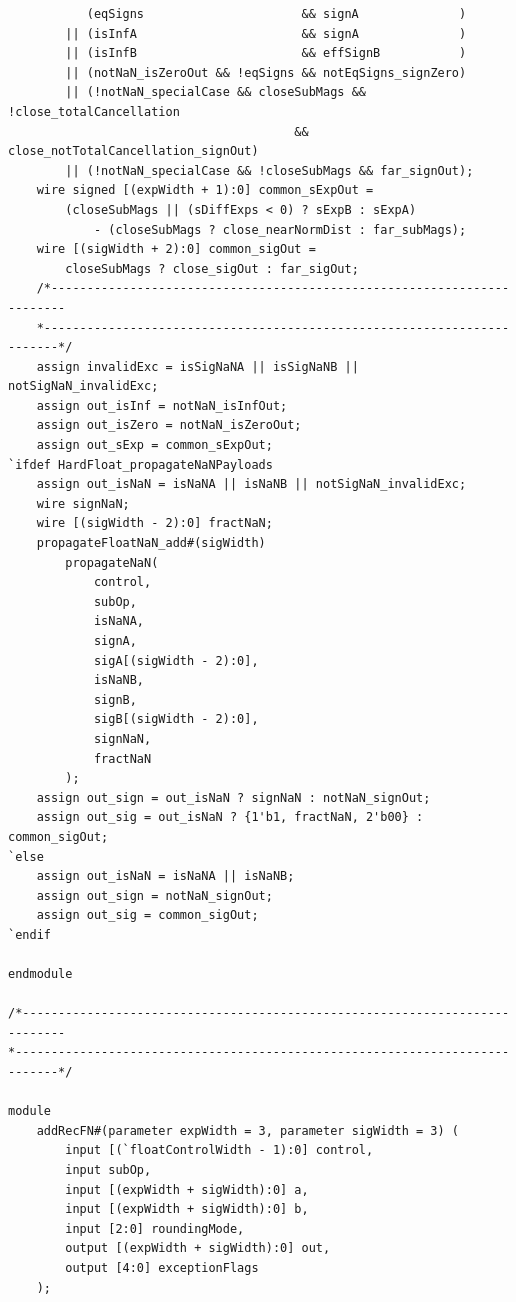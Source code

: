 \documentclass[12pt,letter]{article}
\begin{document}
\begin{lstlisting}
           (eqSigns                      && signA              )
        || (isInfA                       && signA              )
        || (isInfB                       && effSignB           )
        || (notNaN_isZeroOut && !eqSigns && notEqSigns_signZero)
        || (!notNaN_specialCase && closeSubMags && !close_totalCancellation
                                        && close_notTotalCancellation_signOut)
        || (!notNaN_specialCase && !closeSubMags && far_signOut);
    wire signed [(expWidth + 1):0] common_sExpOut =
        (closeSubMags || (sDiffExps < 0) ? sExpB : sExpA)
            - (closeSubMags ? close_nearNormDist : far_subMags);
    wire [(sigWidth + 2):0] common_sigOut =
        closeSubMags ? close_sigOut : far_sigOut;
    /*------------------------------------------------------------------------
    *------------------------------------------------------------------------*/
    assign invalidExc = isSigNaNA || isSigNaNB || notSigNaN_invalidExc;
    assign out_isInf = notNaN_isInfOut;
    assign out_isZero = notNaN_isZeroOut;
    assign out_sExp = common_sExpOut;
`ifdef HardFloat_propagateNaNPayloads
    assign out_isNaN = isNaNA || isNaNB || notSigNaN_invalidExc;
    wire signNaN;
    wire [(sigWidth - 2):0] fractNaN;
    propagateFloatNaN_add#(sigWidth)
        propagateNaN(
            control,
            subOp,
            isNaNA,
            signA,
            sigA[(sigWidth - 2):0],
            isNaNB,
            signB,
            sigB[(sigWidth - 2):0],
            signNaN,
            fractNaN
        );
    assign out_sign = out_isNaN ? signNaN : notNaN_signOut;
    assign out_sig = out_isNaN ? {1'b1, fractNaN, 2'b00} : common_sigOut;
`else
    assign out_isNaN = isNaNA || isNaNB;
    assign out_sign = notNaN_signOut;
    assign out_sig = common_sigOut;
`endif

endmodule

/*----------------------------------------------------------------------------
*----------------------------------------------------------------------------*/

module
    addRecFN#(parameter expWidth = 3, parameter sigWidth = 3) (
        input [(`floatControlWidth - 1):0] control,
        input subOp,
        input [(expWidth + sigWidth):0] a,
        input [(expWidth + sigWidth):0] b,
        input [2:0] roundingMode,
        output [(expWidth + sigWidth):0] out,
        output [4:0] exceptionFlags
    );


\end{lstlisting}
\end{document}

